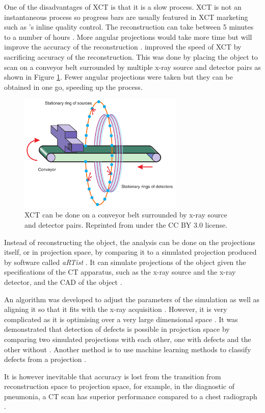 One of the disadvantages of XCT is that it is a slow process. XCT is not an instantaneous process so progress bars are usually featured in XCT marketing such as \cite{nikon2015inline}'s inline quality control. The reconstruction can take between 5 minutes to a number of hours \citep{warnett2016towards}. More angular projections would take more time but will improve the accuracy of the reconstruction \citep{kruth2011computed}. \cite{warnett2016towards} improved the speed of XCT by sacrificing accuracy of the reconstruction. This was done by placing the object to scan on a conveyor belt surrounded by multiple x-ray source and detector pairs as shown in Figure \ref{fig:literature_conveyor}. Fewer angular projections were taken but they can be obtained in one go, speeding up the process.

\begin{figure}
  \centering
  \includegraphics[width=0.7\textwidth]{../figures/literatureReview/literature_conveyor.png}
  \caption{XCT can be done on a conveyor belt surrounded by x-ray source and detector pairs. Reprinted from \cite{warnett2016towards} under the CC BY 3.0 license.}
  \label{fig:literature_conveyor}
\end{figure}

Instead of reconstructing the object, the analysis can be done on the projections itself, or in projection space, by comparing it to a simulated projection produced by software called \emph{aRTist} \citep{bellon2007artist, jaenisch2008artist, bellon2012radiographic}. It can simulate projections of the object given the specifications of the CT apparatus, such as the x-ray source and the x-ray detector, and the CAD of the object \citep{bellon2011simulation, deresch2012simulating}.

An algorithm was developed to adjust the parameters of the simulation as well as aligning it so that it fits with the x-ray acquisition \citep{brierley2018optimized}. However, it is very complicated as it is optimising over a very large dimensional space \citep{brierley2018optimized}. It was demonstrated that detection of defects is possible in projection space by comparing two simulated projections with each other, one with defects and the other without \citep{brierley2018optimized}. Another method is to use machine learning methods to classify defects from a projection \citep{rale2009comparison}.

It is however inevitable that accuracy is lost from the transition from reconstruction space to projection space, for example, in the diagnostic of pneumonia, a CT scan has superior performance compared to a chest radiograph \citep{hayden2009chest}.